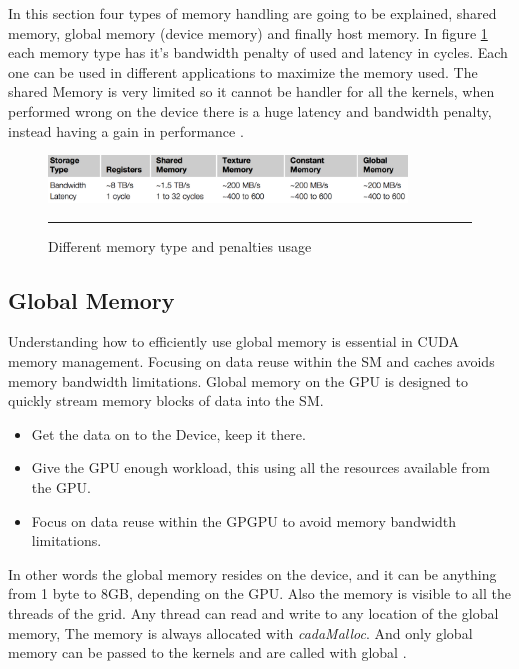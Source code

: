 In this section four types of memory handling are going to be explained, shared memory, global memory (device memory) and finally host memory. In figure \ref{fig:memory} each memory type has it's bandwidth penalty of used and latency in cycles. Each one can be used in different applications to maximize the memory used. The shared Memory is very limited so it cannot be handler for all the kernels, when performed wrong on the device there is a huge latency and bandwidth penalty, instead having a gain in performance \cite{cook}.

\begin{figure}[htbp]
	\centering
		\includegraphics[width=0.85\textwidth]{Figures/memory.png}
		\rule{35em}{0.5pt}
	\caption[Different memory types]{Different memory type and penalties usage}
	\label{fig:memory}
\end{figure}


\subsection{Global Memory}

Understanding how to efficiently use global memory is essential in CUDA memory management.
Focusing on data reuse within the SM and caches avoids memory bandwidth limitations. Global memory on the GPU is designed to quickly stream memory blocks of data into the SM.

\begin{itemize}
\item Get the data on to the Device, keep it there.
\item Give the GPU enough workload, this using all the resources available from the GPU.
\item Focus on data reuse within the GPGPU to avoid memory bandwidth limitations.
\end{itemize}

In other words the global memory resides on the device, and it can be anything from 1 byte to 8GB, depending on the GPU. Also the memory is visible to all the threads of the grid. Any thread can read and write to any location of the global memory, The memory is always allocated with \textit{cadaMalloc}. And only global memory can be passed to the kernels and are called with \twoline global \twoline. \cite{design}


